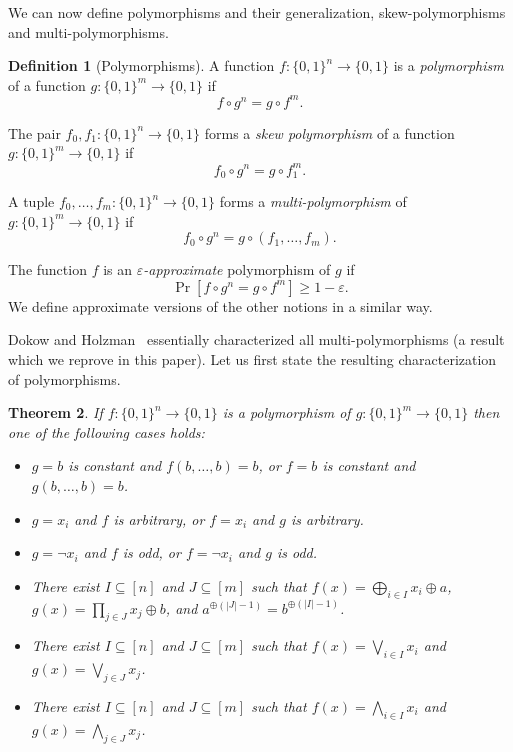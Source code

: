 \documentclass{article}
\newtheorem{theorem}{Theorem}[section]
\theoremstyle{definition}
\newtheorem{definition}[theorem]{Definition}
\theoremstyle{remark}
\providecommand{\biglor}{\bigvee}
\providecommand{\bigland}{\bigwedge}
\newcommand\eps{\varepsilon}
\renewcommand\epsilon{\eps}
\renewcommand\geq{\geqslant}
\begin{document}
We can now define polymorphisms and their generalization, skew-polymorphisms and multi-polymorphisms.

\begin{definition}[Polymorphisms]
A function $f\colon \{0,1\}^n \to \{0,1\}$ is a \emph{polymorphism} of a function $g\colon \{0,1\}^m \to \{0,1\}$ if
\[
 f \circ g^n = g \circ f^m.
\]

The pair $f_0,f_1\colon \{0,1\}^n \to \{0,1\}$ forms a \emph{skew polymorphism} of a function $g\colon \{0,1\}^m \to \{0,1\}$ if
\[
 f_0 \circ g^n = g \circ f_1^m.
\]

A tuple $f_0,\ldots,f_m\colon \{0,1\}^n \to \{0,1\}$ forms a \emph{multi-polymorphism} of $g\colon \{0,1\}^m \to \{0,1\}$ if
\[
 f_0 \circ g^n = g \circ (f_1,\ldots,f_m).
\]

The function $f$ is an \emph{$\epsilon$-approximate} polymorphism of $g$ if
\[
 \Pr[f \circ g^n = g \circ f^m] \geq 1 - \epsilon.
\]
We define approximate versions of the other notions in a similar way.
\end{definition}

Dokow and Holzman~\cite{DH09} essentially characterized all multi-polymorphisms (a result which we reprove in this paper). Let us first state the resulting characterization of polymorphisms.

\begin{theorem} \label{thm:exact-polymorphisms}
If $f\colon \{0,1\}^n \to \{0,1\}$ is a polymorphism of $g\colon \{0,1\}^m \to \{0,1\}$ then one of the following cases holds:
\begin{itemize}
    \item $g = b$ is constant and $f(b,\ldots,b) = b$, or $f = b$ is constant and $g(b,\ldots,b) = b$.
    \item $g = x_i$ and $f$ is arbitrary, or $f = x_i$ and $g$ is arbitrary.
    \item $g = \lnot x_i$ and $f$ is odd, or $f = \lnot x_i$ and $g$ is odd.
    \item There exist $I \subseteq [n]$ and $J \subseteq [m]$ such that $f(x) = \bigoplus_{i \in I} x_i \oplus a$, $g(x) = \prod_{j \in J} x_j \oplus b$, and $a^{\oplus (|J|-1)} = b^{\oplus (|I|-1)}$.
    \item There exist $I \subseteq [n]$ and $J \subseteq [m]$ such that $f(x) = \biglor_{i \in I} x_i$ and $g(x) = \biglor_{j \in J} x_j$.
    \item There exist $I \subseteq [n]$ and $J \subseteq [m]$ such that $f(x) = \bigland_{i \in I} x_i$ and $g(x) = \bigland_{j \in J} x_j$.
\end{itemize}
\end{theorem}
\end{document}
